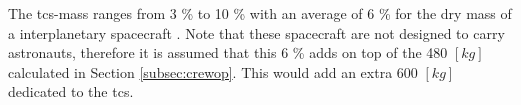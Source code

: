 The \gls{tcs}-mass ranges from 3 \% to 10 \% with an average of 6 \% for the dry mass of a interplanetary spacecraft \cite[p.953]{Wertz2011}. Note that these spacecraft are not designed to carry astronauts, therefore it is assumed that this 6 \% adds on top of the 480 $[kg]$ calculated in Section \ref{subsec:crewop}. This would add an extra 600 $[kg]$ dedicated to the \gls{tcs}.
